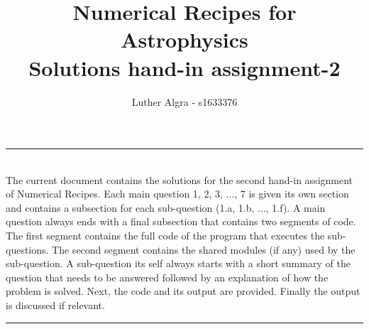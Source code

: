 \documentclass[a4paper,10pt]{article}
\title{\textbf{Numerical Recipes for Astrophysics \\ Solutions hand-in assignment-2}}
\author{Luther Algra - s1633376}
\renewenvironment{abstract}
 { \vspace*{0.3cm} \textbf{\abstractname} \vspace{0.1cm} \\ \ignorespaces}
 {\par\medskip \vspace{0.1cm}}
\begin{document}
\maketitle

\hrule
\begin{abstract}
The current document contains the solutions for the second hand-in assignment of Numerical Recipes. Each main question 1, 2, 3, ..., 7 is given its own section and contains a subsection for each sub-question (1.a, 1.b, ..., 1.f). A main question always ends with a final subsection that contains two segments of code. The first segment contains the full code of the program that executes the sub-questions. The second segment contains the shared modules (if any) used by the sub-question. A sub-question its self always starts with a short summary of the question that needs to be answered followed by an explanation of how the problem is solved. Next, the code and its output are provided. Finally the output is discussed if relevant. 


\end{abstract}
\hrule
\vspace{0.5cm}






  
\end{document}

